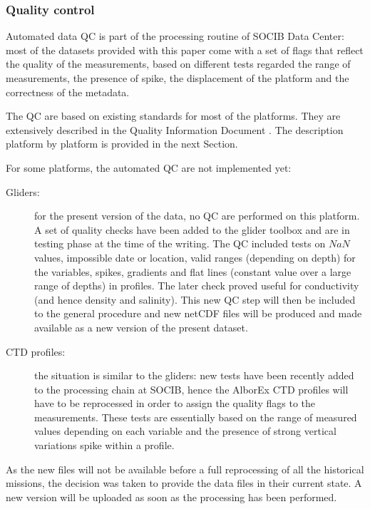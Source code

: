 \documentclass[essd,manuscript]{copernicus}
\begin{document}
\subsubsection{Quality control}

Automated data QC is part of the processing routine of SOCIB Data Center: most of the datasets provided with this paper come with a set of flags that reflect the quality of the measurements, based on different tests regarded the range of measurements, the presence of spike, the displacement of the platform and the correctness of the metadata. 

The QC are based on existing standards for most of the platforms. They are extensively described in the Quality Information Document \citep{SOCIBQC2018}. The description platform by platform is provided in the next Section. 

For some platforms, the automated QC are not implemented yet:
\begin{description}
\item[Gliders:] for the present version of the data, no QC are performed on this platform. A set of quality checks have been added to the glider toolbox \citep[][and available at \url{https://github.com/socib/glider_toolbox}]{TROUPIN16} and are in testing phase at the time of the writing. The QC included tests on $NaN$ values, impossible date or location, valid ranges (depending on depth) for the variables, spikes, gradients and flat lines (constant value over a large range of depths) in profiles. The later check proved useful for conductivity (and hence density and salinity). This new QC step will then be included to the general procedure and new netCDF files will be produced and made available as a new version of the present dataset.
\item[CTD profiles:] the situation is similar to the gliders: new tests have been recently added to the processing chain at SOCIB, hence the AlborEx CTD profiles will have to be reprocessed in order to assign the quality flags to the measurements. These tests are essentially based on the range of measured values depending on each variable and the presence of strong vertical variations spike within a profile.
\end{description}

As the new files will not be available before a full reprocessing of all the historical missions, the decision was taken to provide the data files in their current state. A new version will be uploaded as soon as the processing has been performed.
\end{document}
